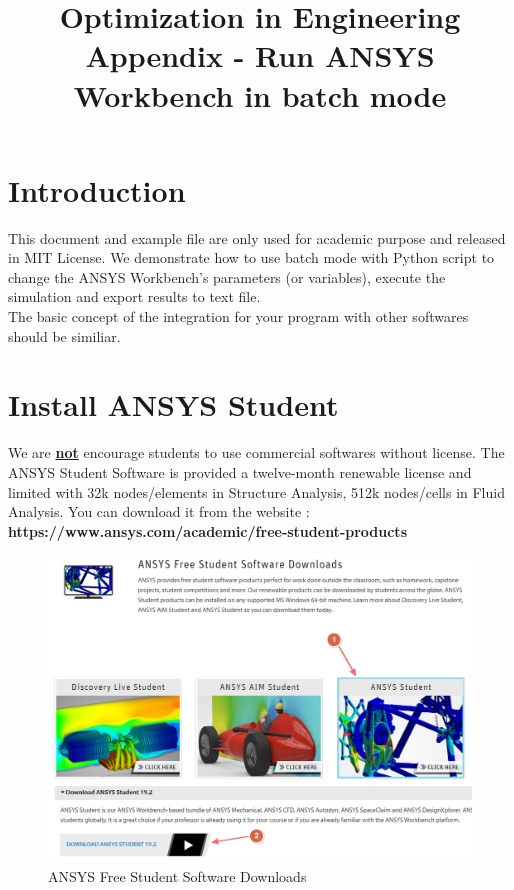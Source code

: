 \documentclass[12pt]{kjleehw}
\begin{document}
\begin{CJK}{UTF8}{bkai} 
\title{\textbf{Optimization in Engineering \\ Appendix - Run ANSYS Workbench in batch mode}}


\section{Introduction}

This document and example file are only used for academic purpose and released in MIT License. We demonstrate how to use batch mode with Python script to change the ANSYS Workbench's parameters (or variables), execute the simulation and export results to text file.\\

The basic concept of the integration for your program with other softwares should be similiar.

\section{Install ANSYS Student}

We are \underline{\textbf{not}} encourage students to use commercial softwares without license. The ANSYS Student Software is provided a twelve-month renewable license and limited with 32k nodes/elements in Structure Analysis, 512k nodes/cells in Fluid Analysis. You can 
download it from the website : \textbf{https://www.ansys.com/academic/free-student-products}

\begin{figure}[h]
	\centering
	\includegraphics[scale=0.4]{figure/download_ansys.png}
	\caption{ANSYS Free Student Software Downloads}
	\label{fig:download_ansys}
\end{figure}


\end{CJK}
\end{document}
